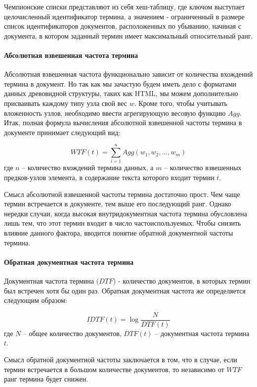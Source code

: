 Чемпионские списки представляют из себя хеш-таблицу, где ключом выступает целочисленный идентификатор термина, а значением - ограниченный в размере список идентификаторов документов, расположенных по убыванию, начиная с документа, в котором заданный термин имеет максимальный относительный ранг. 

\paragraph{Абсолютная взвешенная частота термина}

Абсолютная взвешенная частота функционально зависит от количества вхождений термина в документ. Но так как мы зачастую будем иметь дело с форматами данных древовидной структуры, таких как HTML, мы можем дополнительно присваивать каждому типу узла свой вес $w$. Кроме того, чтобы учитывать вложенность узлов, необходимо ввести агрегирующую весовую функцию $Agg$. Итак, полная формула вычисления абсолютной взвешенной частоты термина в документе принимает следующий вид:

\begin{equation}
WTF(t) = \sum_{i = 1}^{n}Agg(w_1, w_2, ..., w_m)
\end{equation} где $n$ -- количество вхождений термина данных, а $m$ -- количество взвешенных предков-узлов элемента, в содержание текста которого входит термин $t$.

Смысл абсолютной взвешенной частоты термина достаточно прост. Чем чаще термин встречается в документе, тем выше его последующий ранг. Однако нередки случаи, когда высокая внутридокументная частота термина обусловлена лишь тем, что этот термин входит в число частоиспользуемых. Чтобы снизить влияние данного фактора, вводится понятие обратной документной частоты термина.

\paragraph{Обратная документная частота термина}

Документная частота термина ($DTF$) - количество документов, в которых термин был встречен хотя бы один раз. Обратная документная частота же определяется следующим образом:

\begin{equation}
IDTF(t) = \log\frac{N}{DTF(t)}
\end{equation} где $N$ -- общее количество документов, $DTF(t)$ -- документная частота термина $t$.

Смысл обратной документной частоты заключается в том, что в случае, если термин встречается в большом количестве документов, то независимо от $WTF$ ранг термина будет снижен.

